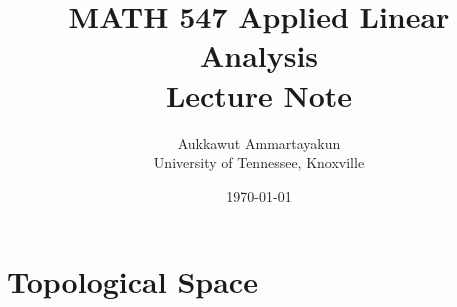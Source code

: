 \documentclass[10pt,a4paper]{article}
\title{\textbf{MATH 547 Applied Linear Analysis}\\
\large{Lecture Note}}
\author{Aukkawut Ammartayakun\\
  \small University of Tennessee, Knoxville}
\date{\today}
\begin{document}
\maketitle
\tableofcontents
\newpage

\section{Topological Space}


\end{document}
